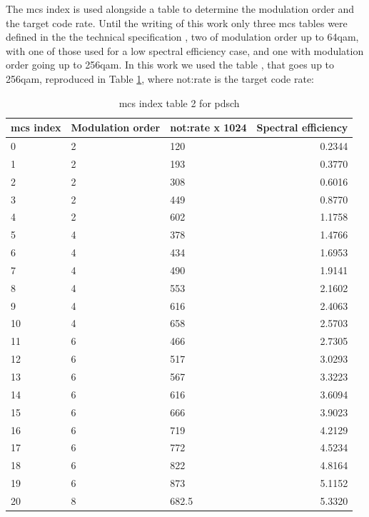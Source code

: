 The \gls{mcs} index is used alongside a table to determine the modulation order and the target code rate.
%
Until the writing of this work only three \gls{mcs} tables were defined in the the technical specification \cite{3gpp.38.214}, two of modulation order up to 64\gls{qam}, with one of those used for a low spectral efficiency case, and one with modulation order going up to 256\gls{qam}.
%
In this work we used the table \cite[Table 5.1.3.1-2]{3gpp.38.214}, that goes up to 256\gls{qam}, reproduced in Table \ref{tab:mcs-table}, where \gls{not:rate} is the target code rate:

\begin{table}[htb]
\centering
\caption{\gls{mcs} index table 2 for \gls{pdsch}}
\label{tab:mcs-table}
\begin{tabularx}{0.95\columnwidth}{l X X r}
  \toprule
  \gls{mcs} index  & Modulation order & \gls{not:rate} x 1024  &  Spectral efficiency \\
  \midrule
  0  &  2   & 120       &  0.2344 \\
  1  &  2   & 193       &  0.3770 \\
  2  &  2   & 308       &  0.6016 \\
  3  &  2   & 449       &  0.8770 \\
  4  &  2   & 602       &  1.1758 \\
  5  &  4   & 378       &  1.4766 \\
  6  &  4   & 434       &  1.6953 \\
  7  &  4   & 490       &  1.9141 \\
  8  &  4   & 553       &  2.1602 \\
  9  &  4   & 616       &  2.4063 \\
  10 &  4   & 658       &  2.5703 \\
  11 &  6   & 466       &  2.7305 \\
  12 &  6   & 517       &  3.0293 \\
  13 &  6   & 567       &  3.3223 \\
  14 &  6   & 616       &  3.6094 \\
  15 &  6   & 666       &  3.9023 \\
  16 &  6   & 719       &  4.2129 \\
  17 &  6   & 772       &  4.5234 \\
  18 &  6   & 822       &  4.8164 \\
  19 &  6   & 873       &  5.1152 \\
  20 &  8   & 682.5     &  5.3320 \\

\end{tabularx}
\end{table}
